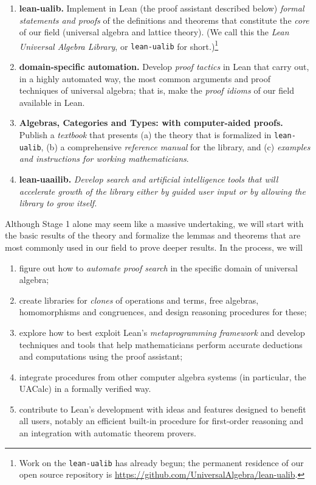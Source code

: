 \documentclass[12pt]{amsart}  %
\begin{document}
\begin{enumerate}
\item[Stage 1.] {\bf lean-ualib.} Implement in Lean (the proof assistant described below) \textsl{formal
 statements and proofs} of the definitions and theorems that constitute
  the \textsl{core} of our field (universal algebra and lattice theory).
  (We call this the \textsl{Lean Universal Algebra Library}, or {\tt lean-ualib} for short.)\footnote{Work on the {\tt lean-ualib} has already begun; the permanent residence of 
  our open source repository is \url{https://github.com/UniversalAlgebra/lean-ualib}.}
\item[Stage 2.] {\bf domain-specific automation.} Develop \textsl{proof tactics} in Lean that carry out, in a highly automated way, the most common arguments and proof techniques of universal algebra; that is, make the \textsl{proof idioms} of our field available in Lean.

\item[Stage 3.] {\bf Algebras, Categories and Types: with computer-aided proofs.} Publish a \textsl{textbook} that presents (a) the theory that is formalized
  in {\tt lean-ualib}, (b) 
  a comprehensive \textsl{reference manual} for the library, and (c) \emph{examples and
  instructions for working mathematicians}.
\item[Stage 4.] {\bf lean-uaailib.}  \textsl{Develop search and artificial intelligence tools that
  will accelerate growth of the library either by guided user input or by allowing the
  library to grow itself.}
\end{enumerate}  
 
Although Stage 1 alone may seem like a massive undertaking, we will start with the
basic results of the theory and formalize the lemmas and theorems that are most commonly
used in our field to prove deeper results.
In the process, we will
\begin{enumerate}
  \item figure out how to \emph{automate proof search} in
    the specific domain of universal algebra;
    \item create libraries for \emph{clones} of operations and terms,
free algebras, homomorphisms and congruences, and design reasoning procedures for these;
\item explore how to best exploit Lean's \emph{metaprogramming framework} and develop
techniques and tools that help mathematicians perform accurate deductions and computations
using the proof assistant;
\item integrate procedures from other computer algebra systems (in particular, the UACalc)
  in a formally verified way.
  \item contribute to Lean's development with ideas and features designed
    to benefit all users, notably an efficient built-in procedure for
    first-order reasoning and an integration with automatic theorem provers.
\end{enumerate}
\end{document}
